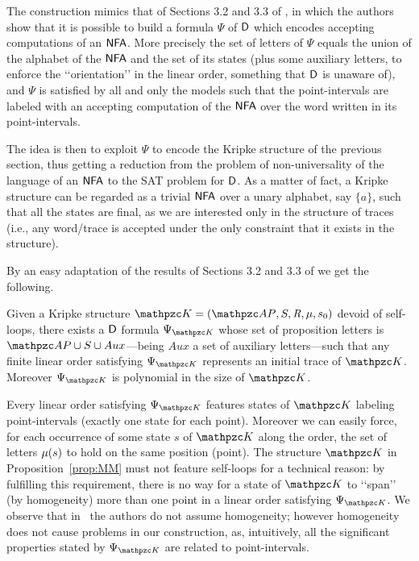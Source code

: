 The construction mimics that of Sections 3.2 and 3.3 of \cite{DBLP:journals/fuin/MarcinkowskiM14}, in which the authors show 
that it is possible to build a formula $\Psi$ of $\mathsf{D}$ which encodes accepting computations of an $\text{\sffamily NFA}$. More precisely the set of letters of $\Psi$ equals the union of the alphabet of the $\text{\sffamily NFA}$ and the set of its states (plus some auxiliary letters, to enforce the \lq\lq orientation\rq\rq{} in the linear order, something that $\mathsf{D}${} is unaware of), and $\Psi$ is satisfied by all and only the models such that the point-intervals are labeled with an accepting computation of the $\text{\sffamily NFA}$ over the word written in its point-intervals.

The idea is then to exploit $\Psi$ to encode the Kripke structure of the previous section, thus getting a reduction from the 
problem of non-universality of the language of an $\text{\sffamily NFA}$ to the SAT problem for $\mathsf{D}$.
As a matter of fact, a Kripke structure can be regarded as a trivial $\text{\sffamily NFA}$ over a unary alphabet, say $\{a\}$, such that all the states are final, as we are interested only in the structure of traces (i.e., any word/trace is accepted under the only constraint that it exists in the structure).

By an easy adaptation of the results of Sections 3.2 and 3.3 of \cite{DBLP:journals/fuin/MarcinkowskiM14} we get the following.
\begin{proposition}\label{prop:MM}
    Given a Kripke structure $\Ku=\KuDef$ devoid of self-loops, there exists a $\mathsf{D}$ formula $\Psi_{\Ku}$ whose set of proposition letters is $\AP\cup\States\cup Aux$---being $Aux$ a set of auxiliary letters---such that any finite linear order satisfying $\Psi_{\Ku}$ represents an initial trace of $\Ku$.
    Moreover $\Psi_{\Ku}$ is polynomial in the size of $\Ku$.
\end{proposition}
Every linear order satisfying $\Psi_{\Ku}$ features states of $\Ku$ labeling point-intervals (exactly one state for each point). 
Moreover we can easily force, for each occurrence of some state $s$ of $\Ku$ along the order, the set of letters $\mu(s)$ to hold on the same position (point).
The structure $\Ku$ in Proposition~\ref{prop:MM} must not feature self-loops for a technical reason: by fulfilling this requirement, there is no way for a state of $\Ku$ to \lq\lq span\rq\rq{} (by homogeneity) more than one point in a linear order satisfying $\Psi_{\Ku}$. 
%
We observe that in~\cite{DBLP:journals/fuin/MarcinkowskiM14} the authors do not assume homogeneity; however homogeneity does not cause problems in our construction, as, intuitively, all the significant properties stated by $\Psi_{\Ku}$ are related to point-intervals. 


